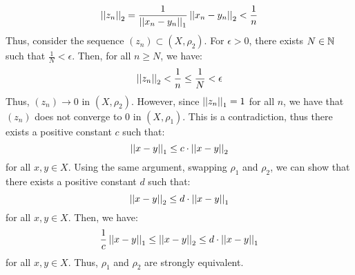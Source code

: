 \documentclass[12pt]{article}
\begin{document}
\begin{solution}
    \[ \left\vert\left\vert z_n\right\vert\right\vert_2 = \frac{1}{\left\vert\left\vert x_n-y_n\right\vert\right\vert_1}\left\vert\left\vert x_n-y_n\right\vert\right\vert_2 < \frac{1}{n}\]
    Thus, consider the sequence $(z_n) \subset (X, \rho_2)$. For $\epsilon > 0$, there exists $N \in \mathbb N$ such that $\frac{1}{N} < \epsilon$. Then, for all $n \geq N$, we have:
    \[ \left\vert\left\vert z_n\right\vert\right\vert_2 < \frac{1}{n} \leq \frac{1}{N}< \epsilon\]
    Thus, $(z_n) \to 0$ in $(X, \rho_2)$. However, since $\left\vert\left\vert z_n\right\vert\right\vert_1 = 1$ for all $n$, we have that $(z_n)$ does not converge to $0$ in $(X, \rho_1)$. This is a contradiction, thus there exists a positive constant $c$ such that:
    \[ \left\vert\left\vert x-y\right\vert\right\vert_1 \leq c\cdot \left\vert\left\vert x-y\right\vert\right\vert_2\]
    for all $x, y \in X$. \bbni
    Using the same argument, swapping $\rho_1$ and $\rho_2$, we can show that there exists a positive constant $d$ such that:
    \[ \left\vert\left\vert x-y\right\vert\right\vert_2 \leq d\cdot \left\vert\left\vert x-y\right\vert\right\vert_1\]
    for all $x, y \in X$. Then, we have:
    \[ \frac{1}{c}\left\vert\left\vert x-y\right\vert\right\vert_1 \leq \left\vert\left\vert x-y\right\vert\right\vert_2 \leq d\cdot\left\vert\left\vert x-y\right\vert\right\vert_1\]
    for all $x, y \in X$. Thus, $\rho_1$ and $\rho_2$ are strongly equivalent.
\end{solution}
\newpage
\end{document}
